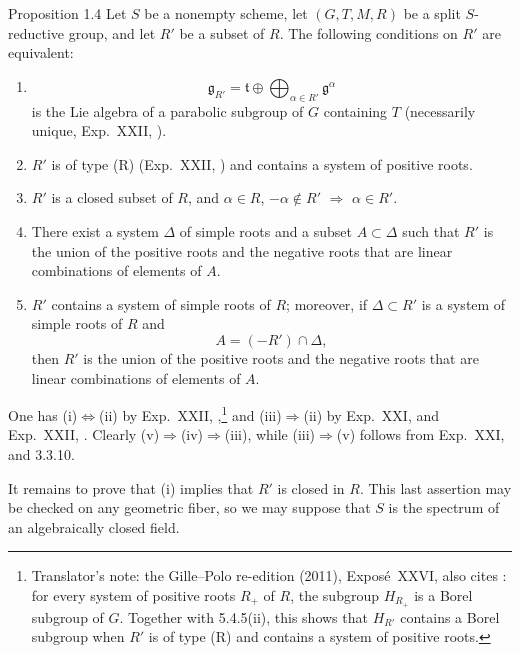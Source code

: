 \begin{sgastatement}{Proposition 1.4}
Let \(S\) be a nonempty scheme, let \((G,T,M,R)\) be a split
\(S\)-reductive group, and let \(R'\) be a subset of \(R\).  The following
conditions on \(R'\) are equivalent:
\begin{enumerate}[label=\textup{(\roman*)}]
\item
\[
 \mathfrak g_{R'}=\mathfrak t\oplus
 \bigoplus_{\alpha\in R'}\mathfrak g^\alpha
\]
is the Lie algebra of a parabolic subgroup of \(G\) containing \(T\)
\textup{(necessarily unique, Exp.\ XXII, )}.
\item \(R'\) is of type \textup{(R)} \textup{(Exp.\ XXII, )} and
contains a system of positive roots.
\item \(R'\) is a closed subset of \(R\), and
\(\alpha\in R\), \(-\alpha\notin R'\) \(\Rightarrow\) \(\alpha\in R'\).
\item There exist a system \(\Delta\) of simple roots and a subset
\(A\subset\Delta\) such that \(R'\) is the union of the positive roots and
the negative roots that are linear combinations of elements of \(A\).
\item{} \(R'\) contains a system of simple roots of \(R\); moreover, if
\(\Delta\subset R'\) is a system of simple roots of \(R\) and
\[
 A=(-R')\cap\Delta,
\]
then \(R'\) is the union of the positive roots and the negative roots that
are linear combinations of elements of \(A\).
\end{enumerate}
\end{sgastatement}

One has (i)\(\Leftrightarrow\)(ii) by Exp.\ XXII, ,\footnote{Translator's note: the Gille--Polo re-edition (2011), Exposé~XXVI, also cites
: for every system of positive roots \(R_+\) of \(R\),
the subgroup \(H_{R_+}\) is a Borel subgroup of \(G\). Together with
5.4.5(ii), this shows that \(H_{R'}\) contains a Borel subgroup when \(R'\)
is of type (R) and contains a system of positive roots.}
and (iii)\(\Rightarrow\)(ii) by Exp.\ XXI,  and Exp.\ XXII, .
Clearly (v)\(\Rightarrow\)(iv)\(\Rightarrow\)(iii), while
(iii)\(\Rightarrow\)(v) follows from Exp.\ XXI,  and 3.3.10.

It remains to prove that (i) implies that \(R'\) is closed in \(R\).  This
last assertion may be checked on any geometric fiber, so we may suppose that
\(S\) is the spectrum of an algebraically closed field.

